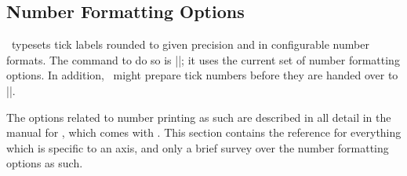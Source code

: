 
\subsection{Number Formatting Options}
\label{sec:number:printing}%
\PGFPlots\ typesets tick labels rounded to given precision and in configurable number formats. The command to do so is |\pgfmathprintnumber|; it uses the current set of number formatting options. In addition, \PGFPlots\ might prepare tick numbers before they are handed over to |\pgfmathprintnumber|.

The options related to number printing as such are described in all detail in the manual for \PGFPlotstable, which comes with \PGFPlots. This section contains the reference for everything which is specific to an axis, and only a brief survey over the number formatting options as such.

